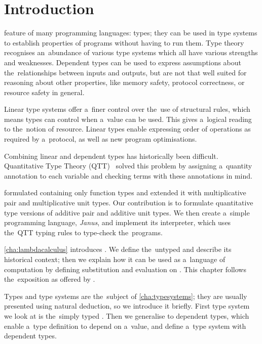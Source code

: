 \chapter*{Introduction}

 feature of many programming languages:
types; they can be used in type systems to establish properties of programs
without having to run them. Type theory recognises an~abundance of various type
systems which all have various strengths and weaknesses. Dependent types can be
used to express assumptions about the~relationships between inputs and outputs,
but are not that well suited for reasoning about other properties, like memory
safety, protocol correctness, or resource safety in general.

Linear type systems offer a~finer control over the~use of structural rules,
which means types can control when a~value can be used. This gives a~logical
reading to the~notion of resource. Linear types enable expressing order of
operations as required by a~protocol, as well as new program optimisations.

Combining linear and dependent types has historically been difficult.
Quantitative Type Theory (QTT)~\citep{mcbride_2016, atkey_2018} solved this
problem by assigning a~quantity annotation to each variable and checking terms
with these annotations in mind.

\citet{mcbride_2016} formulated \lc containing only function types and
\citet{atkey_2018} extended it with multiplicative pair and multiplicative unit
types. Our contribution is to formulate quantitative type versions of additive
pair and additive unit types. We then create a~simple programming language,
\emph{Janus}, and implement its interpreter, which uses the~QTT typing rules to
type-check the~programs.

\autoref{cha:lambdacalculus} introduces \lc. We define the~untyped \lc and
describe its historical context; then we explain how it can be used as
a~language of computation by defining substitution and evaluation on \lts. This
chapter follows the~exposition as offered by \citet{hindley_seldin_2008}.

Types and type systems are the~subject of \autoref{cha:typesystems}; they are
usually presented using natural deduction, so we introduce it briefly. First
type system we look at is the~simply typed \lc. Then we generalise to dependent
types, which enable a~type definition to depend on a~value, and define a~type
system with dependent types.

